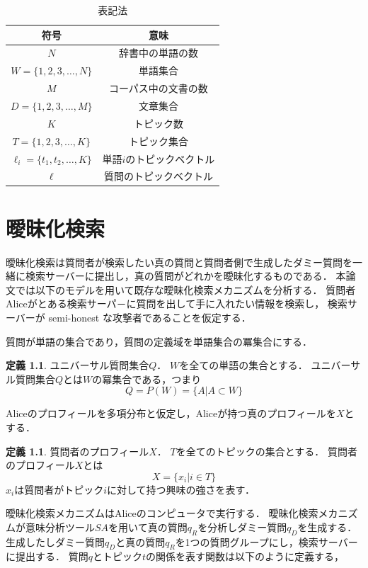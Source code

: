 \documentclass[master]{suribt}
\theoremstyle{definition}
\newtheorem{defi}[thm]{定義}
\begin{document}
 \begin{table}[!hbp]
 \center
 \begin{tabular}{|c|c|}
 \hline
 符号 & 意味 \\
 \hline
 $N$ & 辞書中の単語の数 \\
 $W = \{1,2,3, \dots ,N\} $ & 単語集合 \\
 $M$ & コーパス中の文書の数 \\
 $D = \{1,2,3, \dots ,M\}$ & 文章集合 \\
 $K$ & トピック数 \\
 $T = \{1,2,3, \dots ,K\}$ & トピック集合 \\
 $\ell_i = \{t_1,t_2,\dots,K\} $ & 単語$i$のトピックベクトル \\
 $\ell$ & 質問のトピックベクトル \\
 \hline
 \end{tabular}
 \caption{表記法}
 \end{table}

 \chapter{曖昧化検索}
 曖昧化検索は質問者が検索したい真の質問と質問者側で生成したダミー質問を一緒に検索サーバーに提出し，真の質問がどれかを曖昧化するものである．
 本論文では以下のモデル\cite{}を用いて既存な曖昧化検索メカニズムを分析する．
 質問者Aliceがとある検索サーパ－に質問を出して手に入れたい情報を検索し，
 検索サーバーが semi-honest な攻撃者であることを仮定する．
 
 質問が単語の集合であり，質問の定義域を単語集合の冪集合にする．
 
 \begin{defi}{ユニバーサル質問集合$Q$．}
  $W$を全ての単語の集合とする．
  ユニバーサル質問集合$Q$とは$W$の冪集合である，つまり
  \begin{equation}
  Q = P(W) = \{A|A \subset W\}
  \end{equation}
 \end{defi}
 Aliceのプロフィールを多項分布と仮定し，Aliceが持つ真のプロフィールを$X$とする．
 
 \begin{defi}{質問者のプロフィール$X$．}
  $T$を全てのトピックの集合とする．
  質問者のプロフィール$X$とは
  \begin{equation}
   X = \{x_i| i \in T\}
  \end{equation}
  $x_i$は質問者がトピック$i$に対して持つ興味の強さを表す．
 \end{defi}
 曖昧化検索メカニズムはAliceのコンピュータで実行する．
 曖昧化検索メカニズムが意味分析ツール$SA$を用いて真の質問$q_R$を分析しダミー質問$q_D$を生成する．
 生成したしダミー質問$q_D$と真の質問$q_R$を1つの質問グループにし，検索サーバーに提出する．
 質問$q$とトピック$t$の関係を表す関数は以下のように定義する，
 
\end{document}
